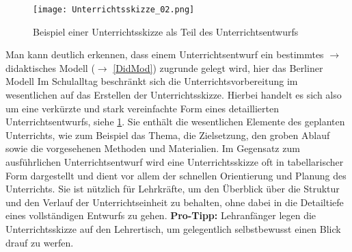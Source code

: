 \begin{figure}[hb]
	\texttt{[image: Unterrichtsskizze\_02.png]}
	\caption{Beispiel einer Unterrichtsskizze als Teil des Unterrichtsentwurfs}
	\label{fig:Unterrichtsskizze}
\end{figure}

\bip
Man kann deutlich erkennen, dass einem Unterrichtsentwurf ein bestimmtes $\to$ didaktisches Modell ($\to$ \cref{DidMod}) zugrunde gelegt wird, hier das Berliner Modell
\mip
Im Schulalltag beschr\"{a}nkt sich  die Unterrichtsvorbereitung im wesentlichen auf das Erstellen der Unterrichtsskizze. Hierbei handelt es sich also um eine verk\"{u}rzte und stark vereinfachte Form eines detaillierten Unterrichtsentwurfs, siehe \cref{fig:Unterrichtsskizze}. Sie enth\"{a}lt die wesentlichen Elemente des geplanten Unterrichts, wie zum Beispiel das Thema, die Zielsetzung, den groben Ablauf sowie die vorgesehenen Methoden und Materialien. Im Gegensatz zum ausf\"{u}hrlichen Unterrichtsentwurf wird eine Unterrichtsskizze oft in tabellarischer Form dargestellt und dient vor allem der schnellen Orientierung und Planung des Unterrichts. Sie ist n\"{u}tzlich f\"{u}r Lehrkr\"{a}fte, um den \"{U}berblick \"{u}ber die Struktur und den Verlauf der Unterrichtseinheit zu behalten, ohne dabei in die Detailtiefe eines vollst\"{a}ndigen Entwurfs zu gehen.
\bip
\textbf{Pro-Tipp:} Lehranf\"{a}nger legen die Unterrichtsskizze auf den Lehrertisch, um gelegentlich selbstbewusst einen Blick drauf zu werfen.
\bip



